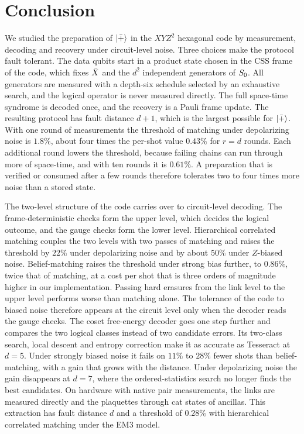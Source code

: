 \section{Conclusion}
\label{sec:conclusion}

We studied the preparation of $\left|\bar{+}\right\rangle$ in the $XYZ^2$ hexagonal code by measurement, decoding and recovery under circuit-level noise. Three choices make the protocol fault tolerant. The data qubits start in a product state chosen in the CSS frame of the code, which fixes $\bar{X}$ and the $d^2$ independent generators of $S_0$. All generators are measured with a depth-six schedule selected by an exhaustive search, and the logical operator is never measured directly. The full space-time syndrome is decoded once, and the recovery is a Pauli frame update. The resulting protocol has fault distance $d+1$, which is the largest possible for $\left|\bar{+}\right\rangle$. With one round of measurements the threshold of matching under depolarizing noise is $1.8\%$, about four times the per-shot value $0.43\%$ for $r=d$ rounds. Each additional round lowers the threshold, because failing chains can run through more of space-time, and with ten rounds it is $0.61\%$. A preparation that is verified or consumed after a few rounds therefore tolerates two to four times more noise than a stored state.

The two-level structure of the code carries over to circuit-level decoding. The frame-deterministic checks form the upper level, which decides the logical outcome, and the gauge checks form the lower level. Hierarchical correlated matching couples the two levels with two passes of matching and raises the threshold by $22\%$ under depolarizing noise and by about $50\%$ under $Z$-biased noise. Belief-matching raises the threshold under strong bias further, to $0.86\%$, twice that of matching, at a cost per shot that is three orders of magnitude higher in our implementation. Passing hard erasures from the link level to the upper level performs worse than matching alone. The tolerance of the code to biased noise therefore appears at the circuit level only when the decoder reads the gauge checks. The coset free-energy decoder goes one step further and compares the two logical classes instead of two candidate errors. Its two-class search, local descent and entropy correction make it as accurate as Tesseract at $d=5$. Under strongly biased noise it fails on $11\%$ to $28\%$ fewer shots than belief-matching, with a gain that grows with the distance. Under depolarizing noise the gain disappears at $d=7$, where the ordered-statistics search no longer finds the best candidates. On hardware with native pair measurements, the links are measured directly and the plaquettes through cat states of ancillas. This extraction has fault distance $d$ and a threshold of $0.28\%$ with hierarchical correlated matching under the EM3 model.

